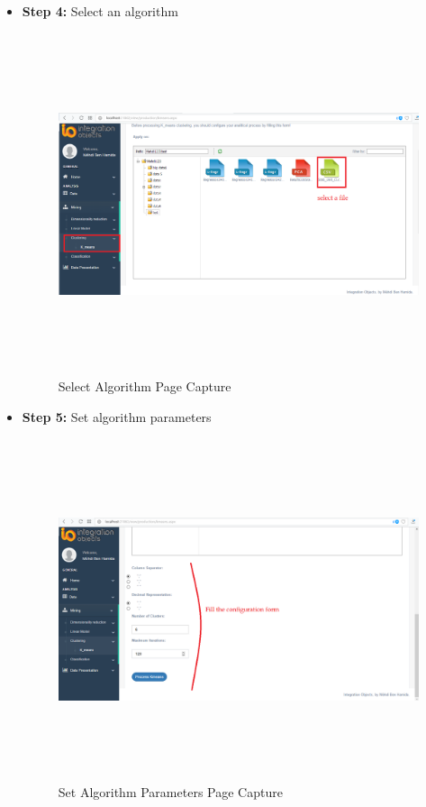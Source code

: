\begin{appendix}
\begin{itemize}
\item \textbf{Step 4:} Select an algorithm\\

\begin{figure}[!ht]
\begin{center}
\includegraphics[width=17cm,height=10cm]{chapter5/k1.png}
\end{center}
\caption{Select Algorithm Page Capture}
\label{s}
\end{figure} 

\item \textbf{Step 5:} Set algorithm parameters\\

\begin{figure}[!ht]
\begin{center}
\includegraphics[width=17cm,height=10cm]{chapter5/k2.png}
\end{center}
\caption{Set Algorithm Parameters Page Capture}
\label{s2}
\end{figure} 


\end{itemize}
\end{appendix}
